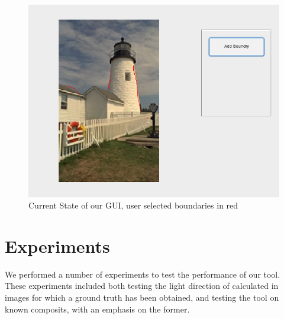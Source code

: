 \documentclass[10pt,twocolumn,letterpaper]{article}
\begin{document}
\begin{figure}[]
	\centering
	\includegraphics[scale=0.35]{gui_pic.png}
	\caption{Current State of our GUI, user selected boundaries in red}
\label{fig:gui}
\end{figure}
\section{Experiments}
We performed a number of experiments to test the performance of our tool. These experiments included both testing the light direction of calculated in images for which a ground truth has been obtained, and testing the tool on known composits, with an emphasis on the former.
\end{document}
